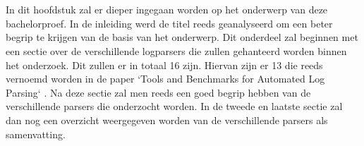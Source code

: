 \chapter{}
\label{ch:stand-van-zaken}






In dit hoofdstuk zal er dieper ingegaan worden op het onderwerp van deze bachelorproef. In de inleiding werd de titel reeds geanalyseerd om een beter begrip te krijgen van de basis van het onderwerp. Dit onderdeel zal beginnen met een sectie over de verschillende logparsers die zullen gehanteerd worden binnen het onderzoek. Dit zullen er in totaal 16 zijn. Hiervan zijn er 13 die reeds vernoemd worden in de paper `Tools and Benchmarks for Automated Log Parsing` \autocite{TBA2019}. Na deze sectie zal men reeds een goed begrip hebben van de verschillende parsers die onderzocht worden. In de tweede en laatste sectie zal dan nog een overzicht weergegeven worden van de verschillende parsers als samenvatting.

